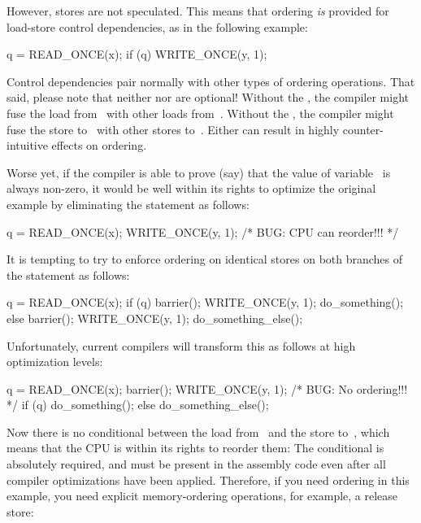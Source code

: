 However, stores are not speculated.
This means that ordering \emph{is} provided for load-store control
dependencies, as in the following example:

\begin{VerbatimN}
q = READ_ONCE(x);
if (q)
	WRITE_ONCE(y, 1);
\end{VerbatimN}

Control dependencies pair normally with other types of ordering operations.
That said, please note that neither  nor 
are optional!
Without the , the compiler might fuse the load
from~ with other loads from~.
Without the , the compiler might fuse the store
to~ with other stores to~.
Either can result in highly counter-intuitive effects on ordering.

Worse yet, if the compiler is able to prove (say) that the value of
variable~ is always non-zero, it would be well within its rights
to optimize the original example by eliminating the  statement
as follows:

\begin{VerbatimN}
q = READ_ONCE(x);
WRITE_ONCE(y, 1); /* BUG: CPU can reorder!!! */
\end{VerbatimN}

It is tempting to try to enforce ordering on identical stores on both
branches of the  statement as follows:

\begin{VerbatimN}
q = READ_ONCE(x);
if (q) {
	barrier();
	WRITE_ONCE(y, 1);
	do_something();
} else {
	barrier();
	WRITE_ONCE(y, 1);
	do_something_else();
}
\end{VerbatimN}

Unfortunately, current compilers will transform this as follows at high
optimization levels:

\begin{VerbatimN}
q = READ_ONCE(x);
barrier();
WRITE_ONCE(y, 1);  /* BUG: No ordering!!! */
if (q) {
	do_something();
} else {
	do_something_else();
}
\end{VerbatimN}

Now there is no conditional between the load from~ and the store
to~, which means that the CPU is within its rights to reorder them:
The conditional is absolutely required, and must be present in the
assembly code even after all compiler optimizations have been applied.
Therefore, if you need ordering in this example, you need explicit
memory-ordering operations, for example, a release store:

